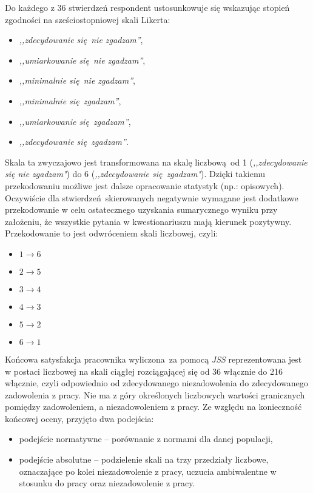 Do każdego z 36 stwierdzeń respondent ustosunkowuje się wskazując stopień zgodności na sześciostopniowej skali Likerta: 
\begin{itemize}
  \item \textit{,,zdecydowanie się nie zgadzam''},
  \item \textit{,,umiarkowanie się nie zgadzam''},
  \item \textit{,,minimalnie się nie zgadzam''},
  \item \textit{,,minimalnie się zgadzam''},
  \item \textit{,,umiarkowanie się zgadzam''},
  \item \textit{,,zdecydowanie się zgadzam''}.
\end{itemize}
Skala ta zwyczajowo jest transformowana na skalę liczbową od 1 (\textit{,,zdecydowanie się nie zgadzam"}) do 6 (\textit{,,zdecydowanie się zgadzam"}). Dzięki takiemu przekodowaniu możliwe jest dalsze opracowanie statystyk (np.: opisowych). Oczywiście dla stwierdzeń skierowanych negatywnie wymagane jest dodatkowe przekodowanie w celu ostatecznego uzyskania sumarycznego wyniku przy założeniu, że wszystkie pytania w kwestionariuszu mają kierunek pozytywny. Przekodowanie to jest odwróceniem skali liczbowej, czyli:

\begin{itemize}
\item $ 1 \rightarrow 6 $
\item $ 2 \rightarrow 5 $
\item $ 3 \rightarrow 4 $
\item $ 4 \rightarrow 3 $
\item $ 5 \rightarrow 2 $
\item $ 6 \rightarrow 1 $
\end{itemize}

Końcowa satysfakcja pracownika wyliczona za pomocą \emph{JSS} reprezentowana jest w postaci liczbowej na skali ciągłej rozciągającej się od 36 włącznie do 216 włącznie, czyli odpowiednio od zdecydowanego niezadowolenia do zdecydowanego zadowolenia z pracy. Nie ma z góry określonych liczbowych wartości granicznych pomiędzy zadowoleniem, a niezadowoleniem z pracy. Ze względu na konieczność końcowej oceny, przyjęto dwa podejścia:
\begin{itemize}
\item podejście normatywne -- porównanie z normami dla danej populacji,
\item podejście absolutne -- podzielenie skali na trzy przedziały liczbowe, oznaczające po kolei niezadowolenie z pracy, uczucia ambiwalentne w stosunku do pracy oraz niezadowolenie z pracy.
\end{itemize}


